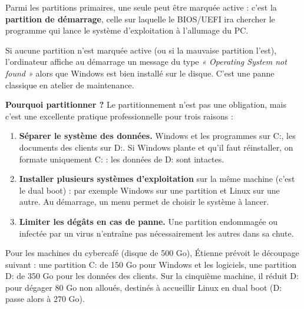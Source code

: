 \documentclass[11pt]{article}
\newcommand{\cle}[1]{{\popxbold\color{popdark}#1}}
\begin{document}
Parmi les partitions primaires, une seule peut être marquée \cle{active} : c'est la \textbf{partition de démarrage}, celle sur laquelle le BIOS/UEFI ira chercher le programme qui lance le système d'exploitation à l'allumage du PC.

\begin{attention}
Si aucune partition n'est marquée active (ou si la mauvaise partition l'est), l'ordinateur affiche au démarrage un message du type \emph{« Operating System not found »} alors que Windows est bien installé sur le disque. C'est une panne classique en atelier de maintenance.
\end{attention}

\textbf{Pourquoi partitionner ?} Le partitionnement n'est pas une obligation, mais c'est une excellente pratique professionnelle pour trois raisons :

\begin{enumerate}
\item \textbf{Séparer le système des données.} Windows et les programmes sur C:, les documents des clients sur D:. Si Windows plante et qu'il faut réinstaller, on formate uniquement C: : les données de D: sont intactes.
\item \textbf{Installer plusieurs systèmes d'exploitation} sur la même machine (c'est le \cle{dual boot}) : par exemple Windows sur une partition et Linux sur une autre. Au démarrage, un menu permet de choisir le système à lancer.
\item \textbf{Limiter les dégâts en cas de panne.} Une partition endommagée ou infectée par un virus n'entraîne pas nécessairement les autres dans sa chute.
\end{enumerate}

\begin{exemplebox}
Pour les machines du cybercafé (disque de 500 Go), Étienne prévoit le découpage suivant : une partition C: de 150 Go pour Windows et les logiciels, une partition D: de 350 Go pour les données des clients. Sur la cinquième machine, il réduit D: pour dégager 80 Go non alloués, destinés à accueillir Linux en dual boot (D: passe alors à 270 Go).
\end{exemplebox}
\end{document}
